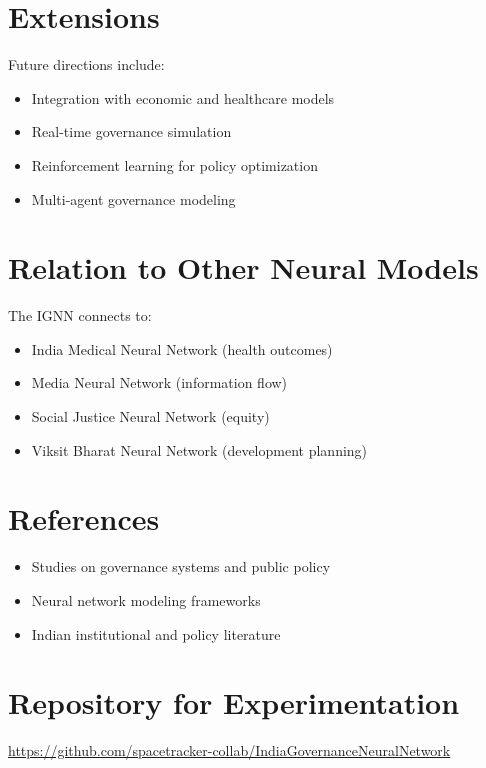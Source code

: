 \documentclass[12pt]{article}
\begin{document}
\section{Extensions}

Future directions include:

\begin{itemize}
\item Integration with economic and healthcare models
\item Real-time governance simulation
\item Reinforcement learning for policy optimization
\item Multi-agent governance modeling
\end{itemize}

\section{Relation to Other Neural Models}

The IGNN connects to:

\begin{itemize}
\item India Medical Neural Network (health outcomes)
\item Media Neural Network (information flow)
\item Social Justice Neural Network (equity)
\item Viksit Bharat Neural Network (development planning)
\end{itemize}

\section{References}

\begin{itemize}
\item Studies on governance systems and public policy
\item Neural network modeling frameworks
\item Indian institutional and policy literature
\end{itemize}

\section{Repository for Experimentation}

\noindent
\url{https://github.com/spacetracker-collab/IndiaGovernanceNeuralNetwork}
\end{document}

